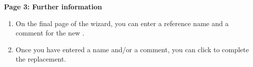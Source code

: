 \textbf{Page 3: Further information}
\begin{enumerate}
\item On the final page of the wizard, you can enter a \gdcase{} reference name and a comment for the new \gdcase{}. 
\item Once you have entered a name and/or a comment, you can click  to complete the replacement.
\end{enumerate}
